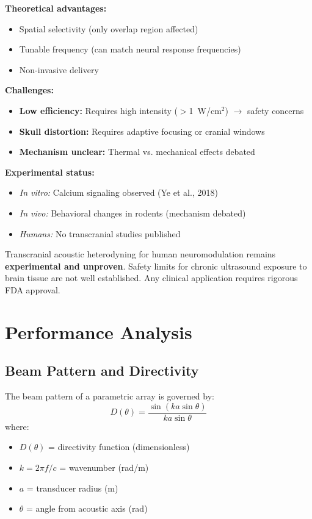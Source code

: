 \textbf{Theoretical advantages:}
\begin{itemize}
\item Spatial selectivity (only overlap region affected)
\item Tunable frequency (can match neural response frequencies)
\item Non-invasive delivery
\end{itemize}

\textbf{Challenges:}
\begin{itemize}
\item \textbf{Low efficiency:} Requires high intensity ($>$1~W/cm$^2$) $\rightarrow$ safety concerns
\item \textbf{Skull distortion:} Requires adaptive focusing or cranial windows
\item \textbf{Mechanism unclear:} Thermal vs. mechanical effects debated
\end{itemize}

\textbf{Experimental status:}
\begin{itemize}
\item \emph{In vitro:} Calcium signaling observed (Ye et al., 2018)
\item \emph{In vivo:} Behavioral changes in rodents (mechanism debated)
\item \emph{Humans:} No transcranial studies published
\end{itemize}

\begin{warningbox}
Transcranial acoustic heterodyning for human neuromodulation remains \textbf{experimental and unproven}. Safety limits for chronic ultrasound exposure to brain tissue are not well established. Any clinical application requires rigorous FDA approval.
\end{warningbox}

\section{Performance Analysis}

\subsection{Beam Pattern and Directivity}

The beam pattern of a parametric array is governed by:
\begin{equation}
D(\theta) = \frac{\sin(ka\sin\theta)}{ka\sin\theta}
\end{equation}
where:
\begin{itemize}
\item $D(\theta)$ = directivity function (dimensionless)
\item $k = 2\pi f/c$ = wavenumber (rad/m)
\item $a$ = transducer radius (m)
\item $\theta$ = angle from acoustic axis (rad)
\end{itemize}

